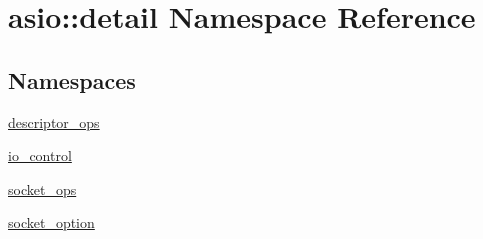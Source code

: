 \hypertarget{namespaceasio_1_1detail}{}\section{asio\+:\+:detail Namespace Reference}
\label{namespaceasio_1_1detail}
\subsection*{Namespaces}
\begin{DoxyCompactItemize}
\item 
 \hyperlink{namespaceasio_1_1detail_1_1descriptor__ops}{descriptor\+\_\+ops}
\item 
 \hyperlink{namespaceasio_1_1detail_1_1io__control}{io\+\_\+control}
\item 
 \hyperlink{namespaceasio_1_1detail_1_1socket__ops}{socket\+\_\+ops}
\item 
 \hyperlink{namespaceasio_1_1detail_1_1socket__option}{socket\+\_\+option}
\end{DoxyCompactItemize}
